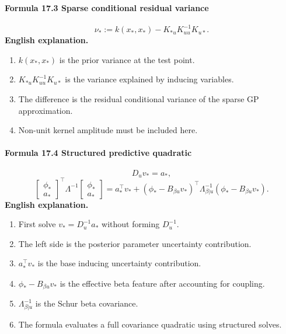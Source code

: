 \documentclass[12pt]{article}
\begin{document}
\paragraph{Formula 17.3 Sparse conditional residual variance}
\[
\nu_*:=k(x_*,x_*)-K_{*u}K_{uu}^{-1}K_{u*}.
\]
\textbf{English explanation.}
\begin{enumerate}[leftmargin=2em]
\item \(k(x_*,x_*)\) is the prior variance at the test point.
\item \(K_{*u}K_{uu}^{-1}K_{u*}\) is the variance explained by inducing variables.
\item The difference is the residual conditional variance of the sparse GP approximation.
\item Non-unit kernel amplitude must be included here.
\end{enumerate}

\paragraph{Formula 17.4 Structured predictive quadratic}
\[
D_uv_*=a_*,
\]
\[
\begin{bmatrix}\phi_*\\a_*\end{bmatrix}^\top
\Lambda^{-1}
\begin{bmatrix}\phi_*\\a_*\end{bmatrix}
=
a_*^\top v_*
+
\left(\phi_*-B_{\beta u}v_*\right)^\top
\Lambda_{\beta|u}^{-1}
\left(\phi_*-B_{\beta u}v_*\right).
\]
\textbf{English explanation.}
\begin{enumerate}[leftmargin=2em]
\item First solve \(v_*=D_u^{-1}a_*\) without forming \(D_u^{-1}\).
\item The left side is the posterior parameter uncertainty contribution.
\item \(a_*^\top v_*\) is the base inducing uncertainty contribution.
\item \(\phi_*-B_{\beta u}v_*\) is the effective beta feature after accounting for coupling.
\item \(\Lambda_{\beta|u}^{-1}\) is the Schur beta covariance.
\item The formula evaluates a full covariance quadratic using structured solves.
\end{enumerate}
\end{document}
